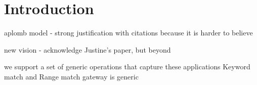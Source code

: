 
\section{Introduction}\label{sec:intro}

aplomb model - strong justification with citations because it is harder to believe

new vision - acknowledge Justine's paper, but beyond 

we support a set of generic operations that capture these applications
Keyword match  and Range match
gateway is generic 

